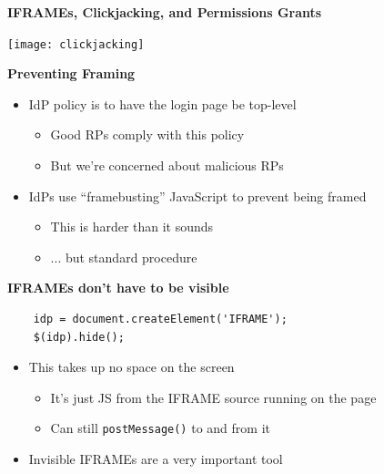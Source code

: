 \documentclass[helvetica]{seminar}
\newcommand{\heading}[1]{%
  \begin{center} 
    \large\bf 
    #1 
  \end{center} 
  \vspace{.4 in}}
\begin{document}
\begin{slide}
\heading{IFRAMEs, Clickjacking, and Permissions Grants}

\begin{center}
\texttt{[image: clickjacking]}
\end{center}

\end{slide}


\begin{slide}
\heading{Preventing Framing}

\begin{itemize}
\item IdP policy is to have the login page be top-level
  \begin{itemize}
  \item Good RPs comply with this policy
  \item But we're concerned about malicious RPs
  \end{itemize}

\item IdPs use ``framebusting'' JavaScript to prevent being framed
  \begin{itemize}
  \item This is harder than it sounds
  \item ... but standard procedure
  \end{itemize}


\end{itemize}

\end{slide}


\begin{slide}
\heading{IFRAMEs don't have to be visible}

\begin{verbatim}
	idp = document.createElement('IFRAME');
	$(idp).hide();

\end{verbatim}

\begin{itemize}
\item This takes up no space on the screen
\begin{itemize}
\item It's just JS from the IFRAME source running on the page
\item Can still \verb^postMessage()^ to and from it
\end{itemize}
\item Invisible IFRAMEs are a very important tool
\end{itemize}
\end{slide}
\end{document}
